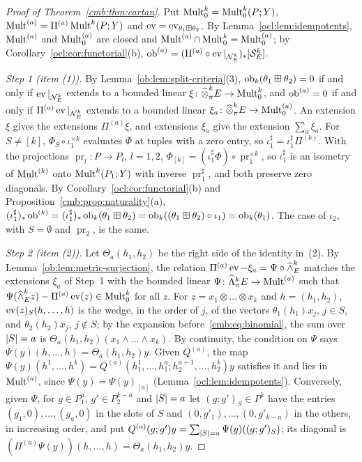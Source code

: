 \begin{proof}[Proof of Theorem~\ref{cmb:thm:cartan}]
Put $\operatorname{Mult}^k_0=\operatorname{Mult}^k_0(P;Y)$, $\operatorname{Mult}^{(a)}=\Pi^{(a)}\operatorname{Mult}^k(P;Y)$ and
$\operatorname{ev}=\operatorname{ev}_{\theta_1\boxplus\theta_2}$. By
Lemma~\ref{ocl:lem:idempotents}, $\operatorname{Mult}^{(a)}$ and $\operatorname{Mult}^{(a)}_0$ are closed and
$\operatorname{Mult}^{(a)}\cap\operatorname{Mult}^k_0=\operatorname{Mult}^{(a)}_0$; by Corollary~\ref{ocl:cor:functorial}(b),
$\operatorname{ob}^{(a)}=(\Pi^{(a)}\circ\operatorname{ev}|_{\mathcal N^k_E})_*[\mathcal S^k_E]$.

\emph{Step 1 (item (1)).} By Lemma~\ref{ob:lem:split-criteria}(3), $\operatorname{ob}_k(\theta_1\boxplus\theta_2)=0$ if and only if
$\operatorname{ev}|_{\mathcal N^k_E}$ extends to a bounded linear $\xi\colon\widehat\otimes^k_\pi E\to\operatorname{Mult}^k_0$, and $\operatorname{ob}^{(a)}=0$ if and
only if $\Pi^{(a)}\operatorname{ev}|_{\mathcal N^k_E}$ extends to a bounded linear $\xi_a\colon\widehat\otimes^k_\pi E\to\operatorname{Mult}^{(a)}_0$. An
extension $\xi$ gives the extensions $\Pi^{(a)}\xi$, and extensions $\xi_a$ give the extension $\sum_a\xi_a$. For
$S\ne[k]$, $\Phi_S\circ\iota_1^{\times k}$ evaluates $\Phi$ at tuples with a zero entry, so
$\iota_1^\sharp=\iota_1^\sharp\Pi^{(k)}$. With the projections $\operatorname{pr}_l\colon P\to P_l$, $l=1,2$,
$\Phi_{[k]}=(\iota_1^\sharp\Phi)\circ\operatorname{pr}_1^{\times k}$, so $\iota_1^\sharp$ is an isometry of $\operatorname{Mult}^{(k)}$
onto $\operatorname{Mult}^k(P_1;Y)$ with inverse $\operatorname{pr}_1^\sharp$, and both preserve zero diagonals. By
Corollary~\ref{ocl:cor:functorial}(b) and Proposition~\ref{cmb:prop:naturality}(a),
$(\iota_1^\sharp)_*\operatorname{ob}^{(k)}=(\iota_1^\sharp)_*\operatorname{ob}_k(\theta_1\boxplus\theta_2)=\operatorname{ob}_k((\theta_1\boxplus\theta_2)\circ\iota_1)=\operatorname{ob}_k(\theta_1)$.
The case of $\iota_2$, with $S=\emptyset$ and $\operatorname{pr}_2$, is the same.

\emph{Step 2 (item (2)).} Let $\Theta_a(h_1,h_2)$ be the right side of the identity in~(2). By
Lemma~\ref{ob:lem:metric-surjection}, the relation $\Pi^{(a)}\operatorname{ev}-\xi_a=\Psi\circ\widehat\wedge^k_E$ matches the
extensions $\xi_a$ of Step~1 with the bounded linear $\Psi\colon\widehat\Lambda^k_\pi E\to\operatorname{Mult}^{(a)}$ such that
$\Psi(\widehat\wedge^k_Ez)-\Pi^{(a)}\operatorname{ev}(z)\in\operatorname{Mult}^k_0$ for all $z$. For $z=x_1\otimes\dots\otimes x_k$ and
$h=(h_1,h_2)$, $\operatorname{ev}(z)_S(h,\dots,h)$ is the wedge, in the order of $j$, of the vectors $\theta_1(h_1)x_j$, $j\in S$, and
$\theta_2(h_2)x_j$, $j\notin S$; by the expansion before~\eqref{cmb:eq:binomial}, the sum over $\lvert S\rvert=a$ is
$\Theta_a(h_1,h_2)(x_1\wedge\dots\wedge x_k)$. By continuity, the condition on $\Psi$ says
$\Psi(y)(h,\dots,h)=\Theta_a(h_1,h_2)y$. Given $Q^{(a)}$, the map
$\Psi(y)(h^1,\dots,h^k)=Q^{(a)}(h^1_1,\dots,h^a_1;h^{a+1}_2,\dots,h^k_2)y$ satisfies it and lies in $\operatorname{Mult}^{(a)}$, since
$\Psi(y)=\Psi(y)_{[a]}$ (Lemma~\ref{ocl:lem:idempotents}). Conversely, given $\Psi$, for $g\in P_1^a$, $g'\in
P_2^{k-a}$ and $\lvert S\rvert=a$ let $(g;g')_S\in P^k$ have the entries $(g_1,0),\dots,(g_a,0)$ in the slots of $S$ and
$(0,g'_1),\dots,(0,g'_{k-a})$ in the others, in increasing order, and put $Q^{(a)}(g;g')y=\sum_{\lvert S\rvert=a}\Psi(y)((g;g')_S)$; its diagonal is $(\Pi^{(a)}\Psi(y))(h,\dots,h)=\Theta_a(h_1,h_2)y$.


\end{proof}
